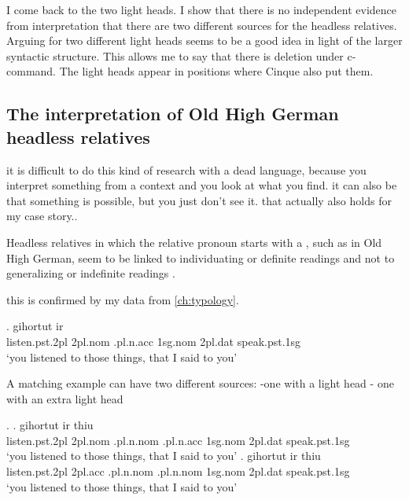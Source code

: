 I come back to the two light heads.
I show that there is no independent evidence from interpretation that there are two different sources for the headless relatives.
Arguing for two different light heads seems to be a good idea in light of the larger syntactic structure. This allows me to say that there is deletion under c-command. The light heads appear in positions where Cinque also put them.


\subsection{The interpretation of Old High German headless relatives}

it is difficult to do this kind of research with a dead language, because you interpret something from a context and you look at what you find. it can also be that something is possible, but you just don't see it. that actually also holds for my case story..

Headless relatives in which the relative pronoun starts with a , such as in Old High German, seem to be linked to individuating or definite readings and not to generalizing or indefinite readings \citep[cf.][]{fuss2017}.

this is confirmed by my data from \ref{ch:typology}.

\exg. gihortut ir    \\
 listen.\ac{pst}.2\ac{pl}\scsub{[acc]} 2\ac{pl}.\ac{nom} .\ac{pl}.\ac{n}.\ac{acc} 1\ac{sg}.\ac{nom} 2\ac{pl}.\ac{dat} speak.\ac{pst}.1\ac{sg}\scsub{[acc]}\\
 `you listened to those things, that I said to you' \label{ex:ohg-acc-acc-rep}

A matching example can have two different sources:
-one with a light head
- one with an extra light head

\ex.
\ag. gihortut ir thiu    \\
 listen.\ac{pst}.2\ac{pl}\scsub{[acc]} 2\ac{pl}.\ac{nom} .\ac{pl}.\ac{n}.\ac{nom} .\ac{pl}.\ac{n}.\ac{acc} 1\ac{sg}.\ac{nom} 2\ac{pl}.\ac{dat} speak.\ac{pst}.1\ac{sg}\scsub{[acc]}\\
 `you listened to those things, that I said to you' \label{ex:ohg-acc-acc-rep}
\bg. gihortut ir thiu    \\
 listen.\ac{pst}.2\ac{pl}\scsub{[acc]} 2\ac{pl}.\ac{acc} .\ac{pl}.\ac{n}.\ac{nom} .\ac{pl}.\ac{n}.\ac{nom} 1\ac{sg}.\ac{nom} 2\ac{pl}.\ac{dat} speak.\ac{pst}.1\ac{sg}\scsub{[acc]}\\
 `you listened to those things, that I said to you' \label{ex:ohg-acc-acc-rep}

